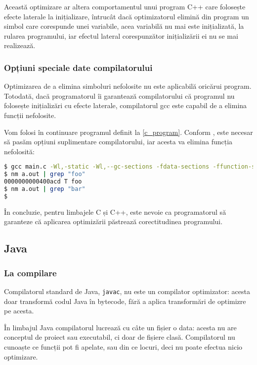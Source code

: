 Această optimizare ar altera comportamentul unui program C++ care
folosește efecte laterale la inițializare, întrucât dacă
optimizatorul elimină din program un simbol care corespunde unei
variabile, acea variabilă nu mai este inițializată, la rularea
programului, iar efectul lateral corespunzător inițializării ei
nu se mai realizează.

\subsubsection{Opțiuni speciale date compilatorului}

Optimizarea de a elimina simboluri nefolosite nu este aplicabilă
oricărui program. Totodată, dacă programatorul îi garantează
compilatorului că programul nu folosește inițializări cu efecte
laterale, compilatorul gcc este capabil de a elimina funcții
nefolosite.

Vom folosi în continuare programul definit la \ref{c_program}.
Conform \cite{c_enable_optimization}, este necesar să pasăm
opțiuni suplimentare compilatorului, iar acesta va elimina
funcția nefolosită:

\begin{lstlisting}[language=Bash]
$ gcc main.c -Wl,-static -Wl,--gc-sections -fdata-sections -ffunction-sections -Os
$ nm a.out | grep "foo"
0000000000400acd T foo
$ nm a.out | grep "bar"
$
\end{lstlisting}

În concluzie, pentru limbajele C și C++, este nevoie ca
programatorul să garanteze că aplicarea optimizării păstrează
corectitudinea programului.

\subsection{Java}

\subsubsection{La compilare}

Compilatorul standard de Java, \texttt{javac}, nu este un compilator
optimizator: acesta doar transformă codul Java în bytecode, fără a aplica
transformări de optimizre pe acesta.

În limbajul Java compilatorul lucrează cu câte un fișier o data: acesta nu are
conceptul de proiect sau executabil, ci doar de fișiere clasă.  Compilatorul nu
cunoaște ce funcții pot fi apelate, sau din ce locuri, deci nu poate efectua
nicio optimizare.

